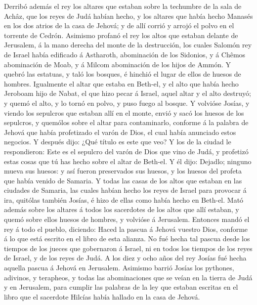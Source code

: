  Derribó además el rey los altares que estaban sobre la
techumbre de la sala de Achâz, que los reyes de Judá habían hecho, y los
altares que había hecho Manasés en los dos atrios de la casa de Jehová;
y de allí corrió y arrojó el polvo en el torrente de Cedrón.
 Asimismo profanó el rey los altos que estaban delante de
Jerusalem, á la mano derecha del monte de la destrucción, los cuales
Salomón rey de Israel había edificado á Astharoth, abominación de los
Sidonios, y á Chêmos abominación de Moab, y á Milcom abominación de los
hijos de Ammón.  Y quebró las estatuas, y taló los bosques,
é hinchió el lugar de ellos de huesos de hombres. 
Igualmente el altar que estaba en Beth-el, y el alto que había hecho
Jeroboam hijo de Nabat, el que hizo pecar á Israel, aquel altar y el
alto destruyó; y quemó el alto, y lo tornó en polvo, y puso fuego al
bosque.  Y volvióse Josías, y viendo los sepulcros que
estaban allí en el monte, envió y sacó los huesos de los sepulcros, y
quemólos sobre el altar para contaminarlo, conforme á la palabra de
Jehová que había profetizado el varón de Dios, el cual había anunciado
estos negocios.  Y después dijo: ¿Qué título es este que
veo? Y los de la ciudad le respondieron: Este es el sepulcro del varón
de Dios que vino de Judá, y profetizó estas cosas que tú has hecho sobre
el altar de Beth-el.  Y él dijo: Dejadlo; ninguno mueva sus
huesos: y así fueron preservados sus huesos, y los huesos del profeta
que había venido de Samaria.  Y todas las casas de los
altos que estaban en las ciudades de Samaria, las cuales habían hecho
los reyes de Israel para provocar á ira, quitólas también Josías, é hizo
de ellas como había hecho en Beth-el.  Mató además sobre
los altares á todos los sacerdotes de los altos que allí estaban, y
quemó sobre ellos huesos de hombres, y volvióse á Jerusalem.
 Entonces mandó el rey á todo el pueblo, diciendo: Haced la
pascua á Jehová vuestro Dios, conforme á lo que está escrito en el libro
de esta alianza.  No fué hecha tal pascua desde los tiempos
de los jueces que gobernaron á Israel, ni en todos los tiempos de los
reyes de Israel, y de los reyes de Judá.  A los diez y ocho
años del rey Josías fué hecha aquella pascua á Jehová en Jerusalem.
 Asimismo barrió Josías los pythones, adivinos, y
terapheos, y todas las abominaciones que se veían en la tierra de Judá y
en Jerusalem, para cumplir las palabras de la ley que estaban escritas
en el libro que el sacerdote Hilcías había hallado en la casa de Jehová.
